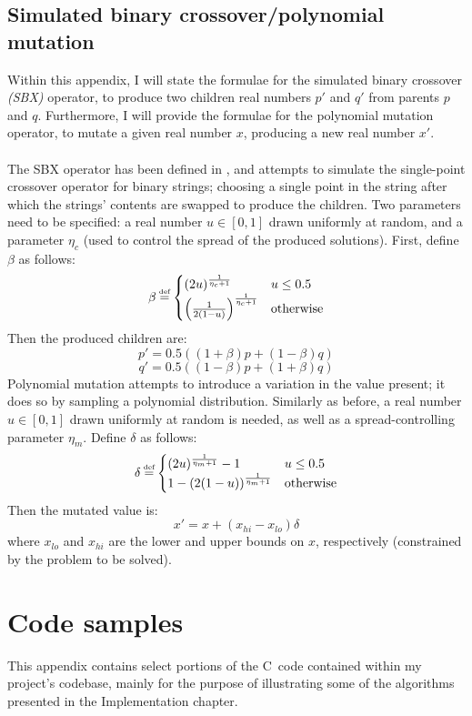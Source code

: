 \documentclass[12pt,a4paper,twoside,openright]{report}
\newcommand\myeq{\stackrel{\mathclap{\tiny\mbox{def}}}{=}}
\def\CC{{C\nolinebreak[4]\hspace{-.05em}\raisebox{.4ex}{\tiny\bf ++}}}
\begin{document}
\section{Simulated binary crossover/polynomial mutation}\label{secsbx}
Within this appendix, I will state the formulae for the simulated binary crossover \emph{(SBX)} operator, to produce two children real numbers $p'$ and $q'$ from parents $p$ and $q$. Furthermore, I will provide the formulae for the polynomial mutation operator, to mutate a given real number $x$, producing a new real number $x'$.\\ \\
The SBX operator has been defined in \cite{deb1994simulated}, and attempts to simulate the single-point crossover operator for binary strings; choosing a single point in the string after which the strings' contents are swapped to produce the children. Two parameters need to be specified: a real number $u\in [0, 1]$ drawn uniformly at random, and a parameter $\eta_c$ (used to control the spread of the produced solutions). First, define $\beta$ as follows:
\[\beta \myeq \begin{cases}
 (2u)^{\frac{1}{\eta_c + 1}} & u \leq 0.5\\
 \left(\frac{1}{2(1-u)}\right)^{\frac{1}{\eta_c + 1}} & \text{otherwise}	
 \end{cases}
\]
Then the produced children are:
\[p' = 0.5((1 + \beta)p + (1 - \beta)q)\]
\[q' = 0.5((1 - \beta)p + (1 + \beta)q)\]
Polynomial mutation attempts to introduce a variation in the value present; it does so by sampling a polynomial distribution. Similarly as before, a real number $u\in [0, 1]$ drawn uniformly at random is needed, as well as a spread-controlling parameter $\eta_m$. Define $\delta$ as follows:
\[\delta \myeq \begin{cases}
 (2u)^{\frac{1}{\eta_m + 1}} - 1 & u \leq 0.5\\
 1 - \left(2(1-u)\right)^{\frac{1}{\eta_m + 1}} & \text{otherwise}	
 \end{cases}
\]
Then the mutated value is:
\[x' = x + (x_{hi} - x_{lo})\delta\]
where $x_{lo}$ and $x_{hi}$ are the lower and upper bounds on $x$, respectively (constrained by the problem to be solved).

\chapter{Code samples}\label{seccodesamples}

This appendix contains select portions of the \CC\ code contained within my project's codebase, mainly for the purpose of illustrating some of the algorithms presented in the Implementation chapter.
\end{document}
